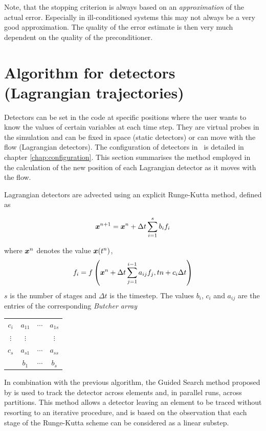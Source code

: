 Note, that the stopping criterion is always based on an \emph{approximation}
of the actual error. Especially in ill-conditioned systems this may not
always be a very good approximation. The quality of the error estimate is
then very much dependent on the quality of the preconditioner.

\section{Algorithm for detectors (Lagrangian trajectories)}
\label{sec:lagrangian_trajectories}
 
Detectors can be set in the code at specific positions where the user wants
to know the values of certain variables at each time step. They are virtual
probes in the simulation and can be fixed in space (static detectors) or can
move with the flow (Lagrangian detectors). The configuration of detectors in
\fluidity\ is detailed in chapter
\ref{chap:configuration}. This section summarises the method
employed in the calculation of the new position of each Lagrangian detector
as it moves with the flow.

Lagrangian detectors are advected using an explicit Runge-Kutta method, defined as

\begin{equation}\label{eq:detectors_RK}
{\mbox{\boldmath$x$}}^{n+1} =  {\mbox{\boldmath$x$}}^{n} + \Delta t \sum_{i=1}^{s} b_i f_i
\end{equation}

where ${\mbox{\boldmath$x$}}^{n}$ denotes the value ${\mbox{\boldmath$x$}}(t^n)$,
\begin{equation}\label{eq:detectors_RK_fi}
f_i = f \left({\mbox{\boldmath$x$}}^{n}+ \Delta t \sum_{j=1}^{i-1} a_{ij} f_j, t{n}+c_i\Delta t\right)
\end{equation}
$s$ is the number of stages and $\Delta t$ is the timestep. The values $b_i$,
$c_i$ and $a_{ij}$ are the entries of the corresponding \emph{Butcher array}

\begin{center}
\begin{tabular}{ c|c c c }
 $c_i$ & $a_{11}$ & $\cdots$ & $a_{1s}$ \\
 $\vdots$ & $\vdots$ & & $\vdots$ \\
 $c_s$ & $a_{s1}$ & $\cdots$ & $a_{ss}$ \\
\hline
  & $b_1$ & $\cdots$ & $b_s$
\end{tabular}
\end{center}

In combination with the previous algorithm, the Guided Search method proposed by \citet{coppola2001}
is used to track the detector across elements and, in parallel runs, across partitions.
This method allows a detector leaving an element to be traced without resorting to an iterative procedure,
and is based on the observation that each stage of the Runge-Kutta scheme can be considered as a linear substep.


